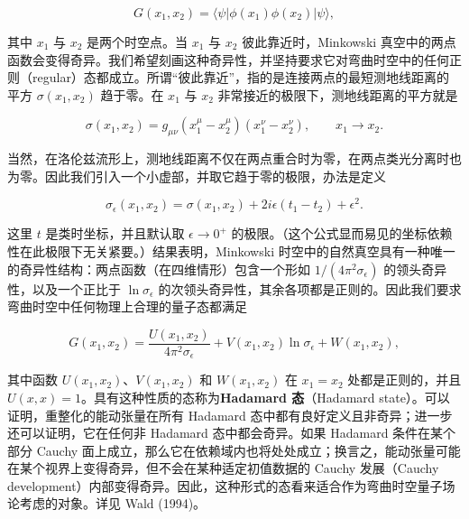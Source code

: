 \begin{equation*}
G(x_1, x_2) = \langle\psi|\phi(x_1)\phi(x_2)|\psi\rangle,
\tag{9.120}
\end{equation*}

其中 $x_1$ 与 $x_2$ 是两个时空点。当 $x_1$ 与 $x_2$ 彼此靠近时，Minkowski 真空中的两点函数会变得奇异。我们希望刻画这种奇异性，并坚持要求它对弯曲时空中的任何正则（regular）态都成立。所谓“彼此靠近”，指的是连接两点的最短测地线距离的平方 $\sigma(x_1,x_2)$ 趋于零。在 $x_1$ 与 $x_2$ 非常接近的极限下，测地线距离的平方就是

\begin{equation*}
\sigma(x_1, x_2) = g_{\mu\nu}(x_1^{\mu} - x_2^{\mu})(x_1^{\nu} - x_2^{\nu}), \qquad x_1 \to x_2.
\tag{9.121}
\end{equation*}

当然，在洛伦兹流形上，测地线距离不仅在两点重合时为零，在两点类光分离时也为零。因此我们引入一个小虚部，并取它趋于零的极限，办法是定义

\begin{equation*}
\sigma_{\epsilon}(x_1, x_2) = \sigma(x_1, x_2) + 2i\epsilon(t_1 - t_2) + \epsilon^{2}.
\tag{9.122}
\end{equation*}

这里 $t$ 是类时坐标，并且默认取 $\epsilon \to 0^{+}$ 的极限。（这个公式显而易见的坐标依赖性在此极限下无关紧要。）结果表明，Minkowski 时空中的自然真空具有一种唯一的奇异性结构：两点函数（在四维情形）包含一个形如 $1/(4\pi^{2}\sigma_{\epsilon})$ 的领头奇异性，以及一个正比于 $\ln\sigma_{\epsilon}$ 的次领头奇异性，其余各项都是正则的。因此我们要求弯曲时空中任何物理上合理的量子态都满足

\begin{equation*}
G(x_1, x_2) = \frac{U(x_1, x_2)}{4\pi^{2}\sigma_{\epsilon}} + V(x_1, x_2)\ln\sigma_{\epsilon} + W(x_1, x_2),
\tag{9.123}
\end{equation*}

其中函数 $U(x_1,x_2)$、$V(x_1,x_2)$ 和 $W(x_1,x_2)$ 在 $x_1=x_2$ 处都是正则的，并且 $U(x,x)=1$。具有这种性质的态称为\textbf{Hadamard 态}（Hadamard state）。可以证明，重整化的能动张量在所有 Hadamard 态中都有良好定义且非奇异；进一步还可以证明，它在任何非 Hadamard 态中都会奇异。如果 Hadamard 条件在某个部分 Cauchy 面上成立，那么它在依赖域内也将处处成立；换言之，能动张量可能在某个视界上变得奇异，但不会在某种适定初值数据的 Cauchy 发展（Cauchy development）内部变得奇异。因此，这种形式的态看来适合作为弯曲时空量子场论考虑的对象。详见 Wald (1994)。

